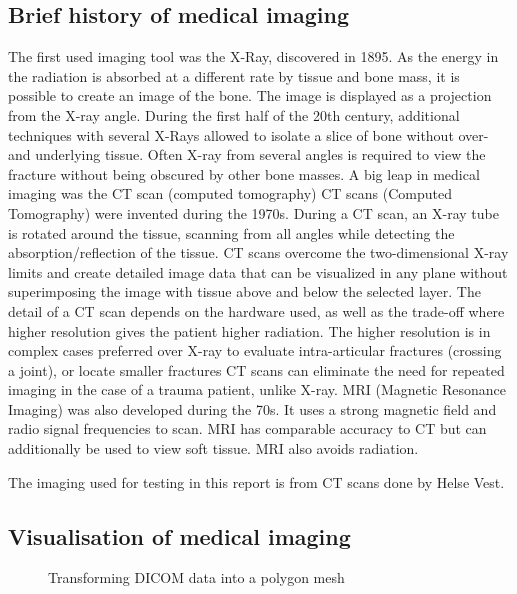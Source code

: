 \documentclass[a4paper]{report}
\begin{document}
\subsection{Brief history of medical imaging}
The first used imaging tool was the X-Ray, discovered in 1895\cite{hamblen_outline_2010}\cite{suetens_fundamentals_2017}. As the energy in the radiation is absorbed at a different rate by tissue and bone mass, it is possible to create an image of the bone. The image is displayed as a projection from the X-ray angle. During the first half of the 20th century, additional techniques with several X-Rays allowed to isolate a slice of bone without over- and underlying tissue. Often X-ray from several angles is required to view the fracture without being obscured by other bone masses\cite{ebnezar_textbook_2016}.
A big leap in medical imaging was the CT scan (computed tomography)\cite{bradley_history_2008}
CT scans (Computed Tomography) were invented during the 1970s. During a CT scan, an X-ray tube is rotated around the tissue, scanning from all angles while detecting the absorption/reflection of the tissue. CT scans overcome the two-dimensional X-ray limits and create detailed image data that can be visualized in any plane without superimposing the image with tissue above and below the selected layer\cite{hamblen_outline_2010}. The detail of a CT scan depends on the hardware used, as well as the trade-off where higher resolution gives the patient higher radiation\cite{bradley_history_2008}. The higher resolution is in complex cases preferred over X-ray to evaluate intra-articular fractures (crossing a joint), or locate smaller fractures\cite{ebnezar_textbook_2016}
CT scans can eliminate the need for repeated imaging in the case of a trauma patient, unlike X-ray\cite{swiontkowski_manual_2013}.
MRI (Magnetic Resonance Imaging) was also developed during the 70s. It uses a strong magnetic field and radio signal frequencies to scan. MRI has comparable accuracy to CT but can additionally be used to view soft tissue. MRI also avoids radiation\cite{swiontkowski_manual_2013}.


The imaging used for testing in this report is from CT scans done by Helse Vest.

\subsection{Visualisation of medical imaging}

\begin{figure}[h!]
    \centering
	\hfill
  \caption{Transforming DICOM data into a polygon mesh}
\end{figure}
\end{document}
